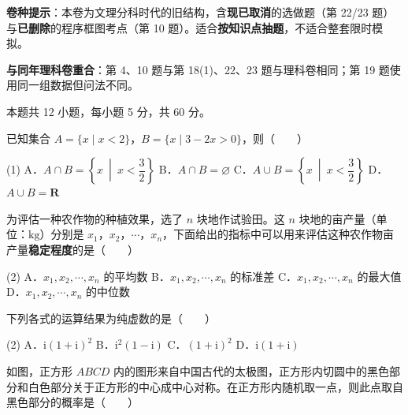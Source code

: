 

\begin{gknotice}
\textbf{ 卷种提示}：本卷为文理分科时代的旧结构，含\textbf{现已取消}的选做题（第 22/23 题）与\textbf{已删除}的程序框图考点（第 10 题）。适合\textbf{按知识点抽题}，不适合整套限时模拟。

\textbf{与同年理科卷重合}：第 4、10 题与第 18(1)、22、23 题与理科卷相同；第 19 题使用同一组数据但问法不同。
\end{gknotice}

\par\medskip


\begin{gktip}
本题共 12 小题，每小题 5 分，共 60 分。
\end{gktip}

已知集合 $A=\{x\mid x<2\}$，$B=\{x\mid3-2x>0\}$，则（　　）

\begin{gkopts}(1)
\task A．$A\cap B=\left\{x\ \middle|\ x<\dfrac32\right\}$
\task B．$A\cap B=\varnothing$
\task C．$A\cup B=\left\{x\ \middle|\ x<\dfrac32\right\}$
\task D．$A\cup B=\mathbf R$
\end{gkopts}

为评估一种农作物的种植效果，选了 $n$ 块地作试验田。这 $n$ 块地的亩产量（单位：$\mathrm{kg}$）分别是 $x_1$，$x_2$，$\cdots$，$x_n$，下面给出的指标中可以用来评估这种农作物亩产量\textbf{稳定程度}的是（　　）

\begin{gkopts}(2)
\task A．$x_1,x_2,\cdots,x_n$ 的平均数
\task B．$x_1,x_2,\cdots,x_n$ 的标准差
\task C．$x_1,x_2,\cdots,x_n$ 的最大值
\task D．$x_1,x_2,\cdots,x_n$ 的中位数
\end{gkopts}

下列各式的运算结果为纯虚数的是（　　）

\begin{gkopts}(2)
\task A．$\mathrm i(1+\mathrm i)^{2}$
\task B．$\mathrm i^{2}(1-\mathrm i)$
\task C．$(1+\mathrm i)^{2}$
\task D．$\mathrm i(1+\mathrm i)$
\end{gkopts}

如图，正方形 $ABCD$ 内的图形来自中国古代的太极图，正方形内切圆中的黑色部分和白色部分关于正方形的中心成中心对称。在正方形内随机取一点，则此点取自黑色部分的概率是（　　）

\begin{center}\end{center}

